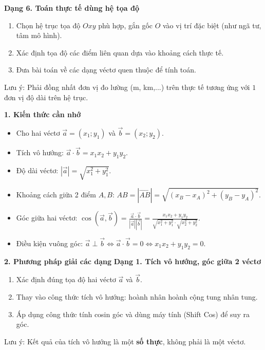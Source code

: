 \textbf{Dạng 6. Toán thực tế dùng hệ tọa độ}
\begin{enumerate}
\item Chọn hệ trục tọa độ $Oxy$ phù hợp, gắn gốc $O$ vào vị trí đặc biệt (như ngã tư, tâm mô hình).
\item Xác định tọa độ các điểm liên quan dựa vào khoảng cách thực tế.
\item Đưa bài toán về các dạng véctơ quen thuộc để tính toán.
\end{enumerate}
Lưu ý: Phải đồng nhất đơn vị đo lường (m, km,...) trên thực tế tương ứng với $1$ đơn vị độ dài trên hệ trục.

\textbf{1. Kiến thức cần nhớ}
\begin{itemize}
\item Cho hai véctơ $\overrightarrow{a} = (x_1; y_1)$ và $\overrightarrow{b} = (x_2; y_2)$.
\item Tích vô hướng: $\boxed{\overrightarrow{a} \cdot \overrightarrow{b} = x_1 x_2 + y_1 y_2}$.
\item Độ dài véctơ: $|\overrightarrow{a}| = \sqrt{x_1^2 + y_1^2}$.
\item Khoảng cách giữa 2 điểm $A, B$: $AB = |\overrightarrow{AB}| = \sqrt{(x_B - x_A)^2 + (y_B - y_A)^2}$.
\item Góc giữa hai véctơ: $\cos(\overrightarrow{a}, \overrightarrow{b}) = \frac{\overrightarrow{a} \cdot \overrightarrow{b}}{|\overrightarrow{a}| |\overrightarrow{b}|} = \frac{x_1 x_2 + y_1 y_2}{\sqrt{x_1^2 + y_1^2} \cdot \sqrt{x_2^2 + y_2^2}}$.
\item Điều kiện vuông góc: $\overrightarrow{a} \perp \overrightarrow{b} \Leftrightarrow \overrightarrow{a} \cdot \overrightarrow{b} = 0 \Leftrightarrow \boxed{x_1 x_2 + y_1 y_2 = 0}$.
\end{itemize}

\textbf{2. Phương pháp giải các dạng}
\textbf{Dạng 1. Tích vô hướng, góc giữa 2 véctơ}
\begin{enumerate}
\item Xác định đúng tọa độ hai véctơ $\overrightarrow{a}$ và $\overrightarrow{b}$.
\item Thay vào công thức tích vô hướng: hoành nhân hoành cộng tung nhân tung.
\item Áp dụng công thức tính cosin góc và dùng máy tính (Shift Cos) để suy ra góc.
\end{enumerate}
Lưu ý: Kết quả của tích vô hướng là một \textbf{số thực}, không phải là một véctơ.

